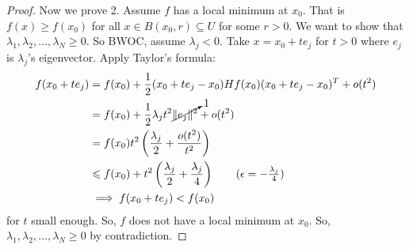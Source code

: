 \documentclass{report}
\begin{document}
\begin{proof}
    \noindent Now we prove 2. Assume $f$ has a local minimum at $x_0$. That is $f(x) \geq f(x_0)$ for all $x \in B(x_0, r) \subseteq U$ for some $r  > 0$. We want to show that $\lambda_1, \lambda_2, \ldots, \lambda_N \geq 0$. So BWOC, assume $\lambda_j < 0$. Take $x = x_0 + te_j$ for $t > 0$ where $e_j$ is $\lambda_j$'s eigenvector. Apply Taylor's formula:
    \begin{align*}
        f(x_0 + te_j) &= f(x_0) + \frac{1}{2}(x_0 + te_j - x_0)Hf(x_0)(x_0 + te_j - x_0)^T + o(t^2) \\
        &= f(x_0) + \frac{1}{2}\lambda_j t^2 \cancelto{1}{\Vert e_j \Vert^2} + o(t^2) \\
        &= f(x_0) t^2 \left( \frac{\lambda_j}{2} + \frac{o(t^2)}{t^2} \right) \\
        &\leq f(x_0) + t^2 \left( \frac{\lambda_j}{2} + \frac{\lambda_j}{4} \right) \tag{$\epsilon = -\frac{\lambda_j}{4}$}\\
        &\implies f(x_0 + te_j) < f(x_0)
    \end{align*}
    for $t$ small enough. So, $f$ does not have a local minimum at $x_0$. So, $\lambda_1, \lambda_2, \ldots, \lambda_N \geq 0$ by contradiction.
\end{proof}
\newpage
\end{document}
